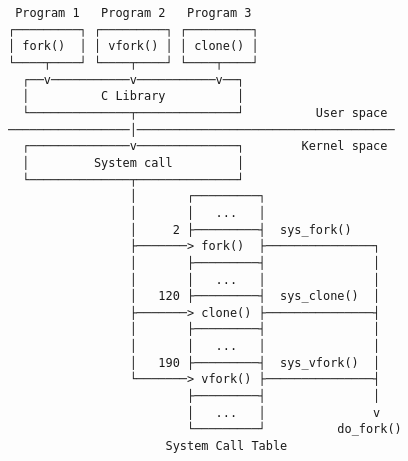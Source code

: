 \documentclass[varwidth=35.2em,crop]{standalone}
\begin{document}
\begin{verbatim}
 Program 1   Program 2   Program 3
┌─────────┐ ┌─────────┐ ┌─────────┐
│ fork()  │ │ vfork() │ │ clone() │
└────┬────┘ └────┬────┘ └────┬────┘
  ┌──v───────────v───────────v──┐
  │          C Library          │
  └──────────────┬──────────────┘          User space
─────────────────│────────────────────────────────────
  ┌──────────────v──────────────┐        Kernel space
  │         System call         │
  └──────────────┬──────────────┘
                 │       ┌─────────┐
                 │       │   ...   │
                 │     2 ├─────────┤  sys_fork()
                 ├───────> fork()  ├───────────────┐
                 │       ├─────────┤               │
                 │       │   ...   │               │
                 │   120 ├─────────┤  sys_clone()  │
                 ├───────> clone() ├───────────────┤
                 │       ├─────────┤               │
                 │       │   ...   │               │
                 │   190 ├─────────┤  sys_vfork()  │
                 └───────> vfork() ├───────────────┤
                         ├─────────┤               │
                         │   ...   │               v
                         └─────────┘          do_fork()
                      System Call Table
\end{verbatim}
\end{document}
